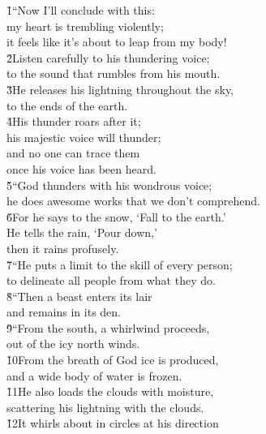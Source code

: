 \begin{poetry}
\poeml {}
\v{1}``Now I'll conclude with this: \\
\poemll    my heart is trembling violently; \\
\poemlll       it feels like it's about to leap from my body! \\
\poeml \v{2}Listen carefully to his thundering voice; \\
\poemll    to the sound that rumbles from his mouth. \\
\poeml \v{3}He releases his lightning throughout the sky, \\
\poemll    to the ends of the earth. \\
\poeml \v{4}His thunder roars after it; \\
\poemll    his majestic voice will thunder; \\
\poeml and no one can trace them \\
\poemll    once his voice has been heard. \\
\poeml \v{5}``God thunders with his wondrous voice; \\
\poemll    he does awesome works that we don't comprehend. \\
\poeml \v{6}For he says to the snow, `Fall to the earth.' \\
\poemll    He tells the rain, `Pour down,' \\
\poemlll       then it rains profusely. \\
\poeml \v{7}``He puts a limit to the skill of every person; \\
\poemll    to delineate all people from what they do. \\
\poeml \v{8}``Then a beast enters its lair \\
\poemll    and remains in its den. \\
\poeml \v{9}``From the south, a whirlwind proceeds, \\
\poemll    out of the icy north winds. \\
\poeml \v{10}From the breath of God ice is produced, \\
\poemll    and a wide body of water is frozen. \\
\poeml \v{11}He also loads the clouds with moisture, \\
\poemll    scattering his lightning with the clouds. \\
\poeml \v{12}It whirls about in circles at his direction \\

\end{poetry}
